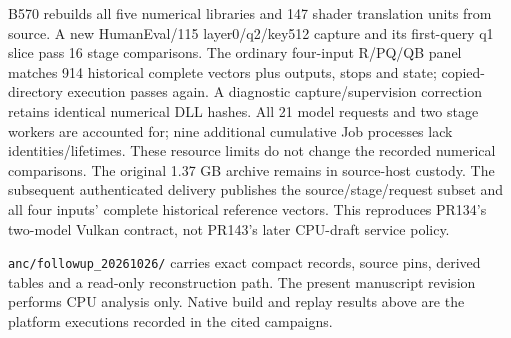 B570 rebuilds all five numerical libraries and 147 shader translation units from source. A new HumanEval/115 layer0/q2/key512 capture and its first-query q1 slice pass 16 stage comparisons. The ordinary four-input R/PQ/QB panel matches 914 historical complete vectors plus outputs, stops and state; copied-directory execution passes again. A diagnostic capture/supervision correction retains identical numerical DLL hashes. All 21 model requests and two stage workers are accounted for; nine additional cumulative Job processes lack identities/lifetimes. These resource limits do not change the recorded numerical comparisons. The original 1.37 GB archive remains in source-host custody. The subsequent authenticated delivery publishes the source/stage/request subset and all four inputs' complete historical reference vectors. This reproduces PR134's two-model Vulkan contract, not PR143's later CPU-draft service policy.

\texttt{anc/followup\_20261026/} carries exact compact records, source pins, derived tables and a read-only reconstruction path. The present manuscript revision performs CPU analysis only. Native build and replay results above are the platform executions recorded in the cited campaigns.
